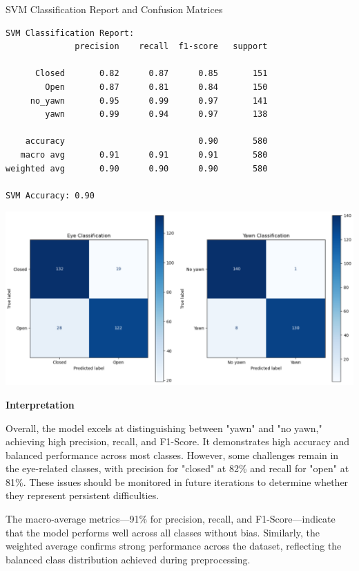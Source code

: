\documentclass{modeleRapport}
\begin{document}
\begin{codebox}[OutputC]{ SVM Classification Report and Confusion Matrices}
\begin{lstlisting}
SVM Classification Report:
              precision    recall  f1-score   support

      Closed       0.82      0.87      0.85       151
        Open       0.87      0.81      0.84       150
     no_yawn       0.95      0.99      0.97       141
        yawn       0.99      0.94      0.97       138

    accuracy                           0.90       580
   macro avg       0.91      0.91      0.91       580
weighted avg       0.90      0.90      0.90       580

SVM Accuracy: 0.90
\end{lstlisting}

\includegraphics[width=14cm]{Images/SVM_cm.png}

\end{codebox}

\textbf{Interpretation\\}


Overall, the model excels at distinguishing between "yawn" and "no yawn," achieving high precision, recall, and F1-Score. It demonstrates high accuracy and balanced performance across most classes. However, some challenges remain in the eye-related classes, with precision for "closed" at 82\% and recall for "open" at 81\%. These issues should be monitored in future iterations to determine whether they represent persistent difficulties.

The macro-average metrics—91\% for precision, recall, and F1-Score—indicate that the model performs well across all classes without bias. Similarly, the weighted average confirms strong performance across the dataset, reflecting the balanced class distribution achieved during preprocessing.
\end{document}
